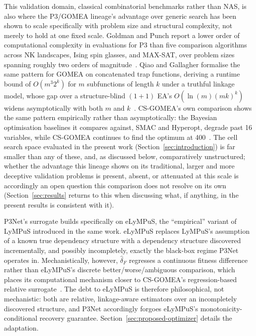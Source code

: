 This validation domain, classical combinatorial benchmarks rather than NAS, is also where the P3/GOMEA lineage's advantage over generic search has been shown to scale specifically with problem size and structural complexity, not merely to hold at one fixed scale. Goldman and Punch report a lower order of computational complexity in evaluations for P3 than five comparison algorithms across NK landscapes, Ising spin glasses, and MAX-SAT, over problem sizes spanning roughly two orders of magnitude~\citep{goldman2015fast}. Qiao and Gallagher formalise the same pattern for GOMEA on concatenated trap functions, deriving a runtime bound of $O(m^3 2^k)$ for $m$ subfunctions of length $k$ under a truthful linkage model, whose gap over a structure-blind $(1+1)$ EA's $O(\ln(m)(mk)^k)$ widens asymptotically with both $m$ and $k$~\citep{qiao2024gomearuntime}. CS-GOMEA's own comparison shows the same pattern empirically rather than asymptotically: the Bayesian optimisation baselines it compares against, SMAC and Hyperopt, degrade past 16 variables, while CS-GOMEA continues to find the optimum at 400~\citep{dushatskiy2019csgomea}. The cell search space evaluated in the present work (Section~\ref{sec:introduction}) is far smaller than any of these, and, as discussed below, comparatively unstructured; whether the advantage this lineage shows on its traditional, larger and more deceptive validation problems is present, absent, or attenuated at this scale is accordingly an open question this comparison does not resolve on its own (Section~\ref{sec:results} returns to this when discussing what, if anything, in the present results is consistent with it).

P3Net's surrogate builds specifically on eLyMPuS, the ``empirical'' variant of LyMPuS introduced in the same work. eLyMPuS replaces LyMPuS's assumption of a known true dependency structure with a dependency structure discovered incrementally, and possibly incompletely, exactly the black-box regime P3Net operates in. Mechanistically, however, $\hat{\delta}_F$ regresses a continuous fitness difference rather than eLyMPuS's discrete better/worse/ambiguous comparison, which places its computational mechanism closer to CS-GOMEA's regression-based relative surrogate~\citep{dushatskiy2019csgomea}. The debt to eLyMPuS is therefore philosophical, not mechanistic: both are relative, linkage-aware estimators over an incompletely discovered structure, and P3Net accordingly forgoes eLyMPuS's monotonicity-conditional recovery guarantee. Section~\ref{sec:proposed-optimizer} details the adaptation.

